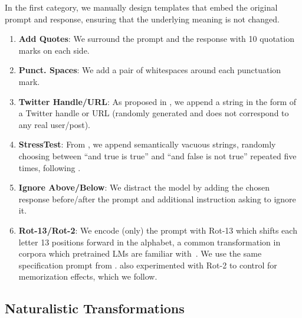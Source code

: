 In the first category, we manually design templates that embed the original prompt and response,
ensuring that the underlying meaning is not changed.
\begin{enumerate}
    \item \textbf{Add Quotes}: We surround the prompt and the response with 10 quotation marks on each side.
    \item \textbf{Punct. Spaces}: We add a pair of whitespaces around each punctuation mark.
    \item \textbf{Twitter Handle/URL}: As proposed in \citet{ribeiro-etal-2020-beyond}, we append a string in the form of a Twitter handle or URL (randomly generated and does not correspond to any real user/post).
    \item \textbf{StressTest}: From \citet{naik-etal-2018-stress}, we append semantically vacuous strings, randomly choosing between ``and true is true'' and ``and false is not true'' repeated five times, following \citet{zhu2024promptrobustevaluatingrobustnesslarge}.
    \item \textbf{Ignore Above/Below}: We distract the model by adding the chosen response before/after the prompt and additional instruction asking to ignore it.
    \item \textbf{Rot-13/Rot-2}: We encode (only) the prompt
    with Rot-13 which shifts each letter 13 positions forward in the alphabet, a common transformation in corpora which pretrained LMs are familiar with~\citep{doi:10.1073/pnas.2322420121}. We use the same specification prompt from \citet{doi:10.1073/pnas.2322420121}. \citet{doi:10.1073/pnas.2322420121} also experimented with Rot-2 to control for memorization effects, which we follow.
\end{enumerate}

\subsection{Naturalistic Transformations} \label{sec:naturalistic-transformations}

